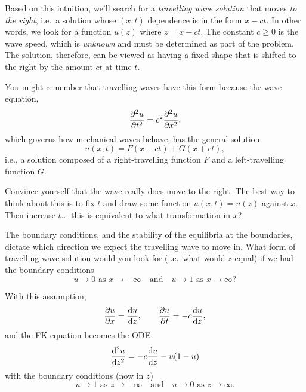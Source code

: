 \documentclass[main.tex]{subfiles}
\begin{document}
Based on this intuition, we’ll search for a \emph{travelling wave solution} that moves \emph{to the right}, i.e.\ a solution whose $(x,t)$ dependence is in the form $x-ct$. In other words, we look for a function $u(z)$ where $z = x-ct$. The constant $c \geq 0$ is the wave speed, which is \emph{unknown} and must be determined as part of the problem. The solution, therefore, can be viewed as having a fixed shape that is shifted to the right by the amount $ct$ at time $t$.

\begin{info}
You might remember that travelling waves have this form because the wave equation,
\begin{equation}
	\pdd{u}{t} = c^2 \pdd{u}{x},
\end{equation}
which governs how mechanical waves behave, has the general solution
\begin{equation}
	u(x,t) = F(x-ct) + G(x+ct),
\end{equation}
i.e., a solution composed of a right-travelling function $F$ and a left-travelling function $G$.
\end{info}

\begin{do-it-yourself}
Convince yourself that the wave really does move to the right. The best way to think about this is to fix $t$ and draw some function $u(x,t)=u(z)$ against $x$. Then increase $t$... this is equivalent to what transformation in $x$?
\end{do-it-yourself}

\begin{do-it-yourself}
	The boundary conditions, and the stability of the equilibria at the boundaries, dictate which direction we expect the travelling wave to move in. What form of travelling wave solution would you look for (i.e.\ what would $z$ equal) if we had the boundary conditions 
	\begin{equation}
	u \to 0 \text{ as } x \to -\infty \quad \text{and} \quad u \to 1 \text{ as } x \to \infty?
	\end{equation}
\end{do-it-yourself}

With this assumption, 
\begin{equation}
	\pd{u}{x} = \fd{u}{z}, \qquad \pd{u}{t} = -c\fd{u}{z},
\end{equation}
and the FK equation becomes the ODE
\begin{equation}
	\fdd{u}{z} = -c \fd{u}{z} -u(1-u)
\end{equation}
with the boundary conditions (now in $z$)
\begin{equation}
	u \to 1 \text{ as } z \to -\infty \quad \text{and} \quad u \to 0 \text{ as } z \to \infty.
\end{equation}
\end{document}
